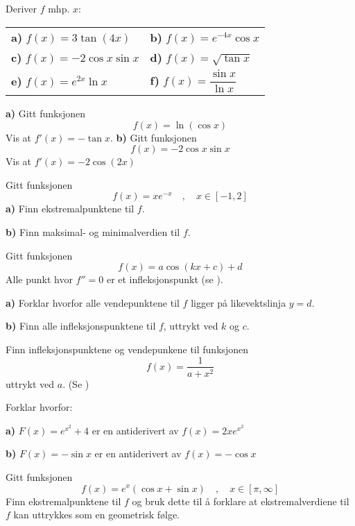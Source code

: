 



	
\eqlen	
\opgt
\setcounter{section}{1}	
Deriver $ f $ mhp. $ x $: \br

\begin{tabular}{@{}l l}	
	\textbf{a)} $ f(x)= 3\tan (4x)  $&\quad\textbf{b)} $f(x)=e^{-4x}\cos x$  \vspace{9 pt}\\
	\textbf{c)} $f(x)=-2 \cos x \sin x$
	&\quad \textbf{d)} $f(x)= \sqrt{\tan x}$ \vspace{9 pt}\\
	\textbf{e)} $f(x)= e^{2x} \ln x $ &\quad\textbf{f)} $f(x)= \dfrac{\sin x}{\ln x} $ 
\end{tabular}

\textbf{a)} Gitt funksjonen
\[ f(x)=\ln(\cos x) \]
Vis at $ {f'(x)=-\tan x} $.\os
\textbf{b)} Gitt funksjonen
\[ f(x)=-2\cos x \sin x \]
Vis at $ {f'(x)=-2\cos(2x)} $

\nes
{}
Gitt funksjonen
\[  f(x)=xe^{-x} \quad,\quad x\in[-1, 2]\]
\textbf{a)} Finn ekstremalpunktene til $ f $.\os

\textbf{b)} Finn maksimal- og minimalverdien til $ f $.

Gitt funksjonen
\[ f(x)=a\cos(kx+c)+d  \]
Alle punkt hvor $ {f''=0} $ er et infleksjonspunkt (se ).\os

\textbf{a)} Forklar hvorfor alle vendepunktene til $ f $
ligger på likevektslinja ${ y= d }$. \os

\textbf{b)} Finn alle infleksjonspunktene til $ f $, uttrykt ved $ k $ og $ c $. \os


Finn infleksjonspunktene og vendepunkene til funksjonen
\[ f(x)=\frac{1}{a+x^2} \]
uttrykt ved $ a $. (Se )

\nes
\newpage
{}
Forklar hvorfor:\os

\textbf{a)} ${F(x)= e^{x^2}+4} $ er en antiderivert av ${f(x)= 2xe^{x^2}} $\os

\textbf{b)} ${F(x)= -\sin x} $ er en antiderivert av ${f(x)= -\cos x} $

\ekspop
Gitt funksjonen
\[ f(x)=e^x(\cos x+\sin x)\quad,\quad x\in\left[\pi, \infty\right]\]
Finn ekstremalpunktene til $ f $ og bruk dette til å forklare at ekstremalverdiene til $ f $ kan uttrykkes som en geometrisk følge.
